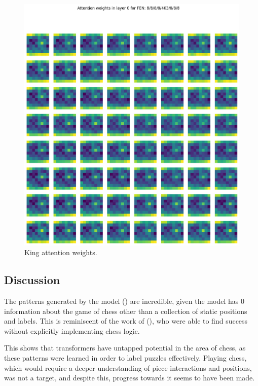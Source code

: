 \begin{figure}[H]
\begin{minipage}{0.475\textwidth}
    \includegraphics[width=\textwidth]{project/img/attention_maps/K_weights_0.png}
    \caption{King attention weights.}
    \label{atnK1}
  \end{minipage}
\end{figure}

\subsection{Discussion}\label{mlS33}

The patterns generated by the model () are incredible, given the
model has 0 information about the game of chess other than a collection of
static positions and labels. This is reminiscent of the work of
\citet{chess2vec} (), who were able to find success without
explicitly implementing chess logic.

This shows that transformers have untapped potential in the area of chess, as
these patterns were learned in order to label puzzles effectively. Playing
chess, which would require a deeper understanding of piece interactions and
positions, was not a target, and despite this, progress towards it seems to
have been made.




